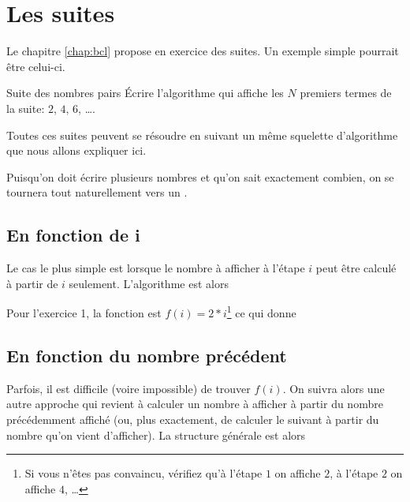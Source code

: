 \chapter{Les suites}

Le chapitre \ref{chap:bcl} propose en exercice des suites.
Un exemple simple pourrait être celui-ci.

\begin{Exercice}{Suite des nombres pairs}
	Écrire l'algorithme qui affiche les $N$ premiers termes
	de la suite: $2$, $4$, $6$, \dots.
\end{Exercice}

Toutes ces suites peuvent se résoudre 
en suivant un même squelette d'algorithme que nous allons expliquer ici.

Puisqu'on doit écrire plusieurs nombres et qu'on sait exactement combien,
on se tournera tout naturellement vers un .

\section*{En fonction de i}

Le cas le plus simple est lorsque le nombre à afficher à l'étape $i$
peut être calculé à partir de $i$ seulement.
L'algorithme est alors


Pour l'exercice 1, la fonction est $f(i)=2*i$\footnote{Si vous
n'êtes pas convaincu, vérifiez qu'à l'étape $1$ on affiche $2$,
à l'étape $2$ on affiche $4$, \dots} ce qui donne


\section*{En fonction du nombre précédent}

Parfois, il est difficile (voire impossible) de trouver $f(i)$.
On suivra alors une autre approche qui revient à calculer un nombre
à afficher à partir du nombre précédemment affiché
(ou, plus exactement, de calculer le suivant à partir du nombre
qu'on vient d'afficher).
La structure générale est alors

